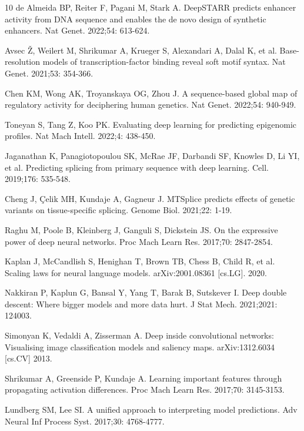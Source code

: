 \documentclass[10pt,letterpaper]{article}
\begin{document}
\begin{thebibliography}{10}
 de Almeida BP, Reiter F, Pagani M, Stark A. DeepSTARR predicts enhancer activity from DNA sequence and enables the de novo design of synthetic enhancers. Nat Genet. 2022;54: 613-624.

 Avsec {\v{Z}}, Weilert M, Shrikumar A, Krueger S, Alexandari A, Dalal K, et al. Base-resolution models of transcription-factor binding reveal soft motif syntax. Nat Genet. 2021;53: 354-366.

 Chen KM, Wong AK, Troyanskaya OG, Zhou J. A sequence-based global map of regulatory activity for deciphering human genetics. Nat Genet. 2022;54: 940-949.

 Toneyan S, Tang Z, Koo PK. Evaluating deep learning for predicting epigenomic profiles. Nat Mach Intell. 2022;4: 438-450.

 Jaganathan K, Panagiotopoulou SK, McRae JF, Darbandi SF, Knowles D, Li YI, et al. Predicting splicing from primary sequence with deep learning. Cell. 2019;176: 535-548.

 Cheng J, {\c{C}}elik MH, Kundaje A, Gagneur J. MTSplice predicts effects of genetic variants on tissue-specific splicing. Genome Biol. 2021;22: 1-19.

 Raghu M, Poole B, Kleinberg J, Ganguli S, Dickstein JS. On the expressive power of deep neural networks. Proc Mach Learn Res. 2017;70: 2847-2854.

 Kaplan J, McCandlish S, Henighan T, Brown TB, Chess B, Child R, et al. Scaling laws for neural language models. arXiv:2001.08361 [cs.LG]. 2020.

 Nakkiran P, Kaplun G, Bansal Y, Yang T, Barak B, Sutskever I. Deep double descent: Where bigger models and more data hurt. J Stat Mech. 2021;2021: 124003.

 Simonyan K, Vedaldi A, Zisserman A. Deep inside convolutional networks: Visualising image classification models and saliency maps. arXiv:1312.6034 [cs.CV] 2013.

 Shrikumar A, Greenside P, Kundaje A. Learning important features through propagating activation differences. Proc Mach Learn Res. 2017;70: 3145-3153.

 Lundberg SM, Lee SI. A unified approach to interpreting model predictions. Adv Neural Inf Process Syst. 2017;30: 4768-4777.


\end{thebibliography}
\end{document}
